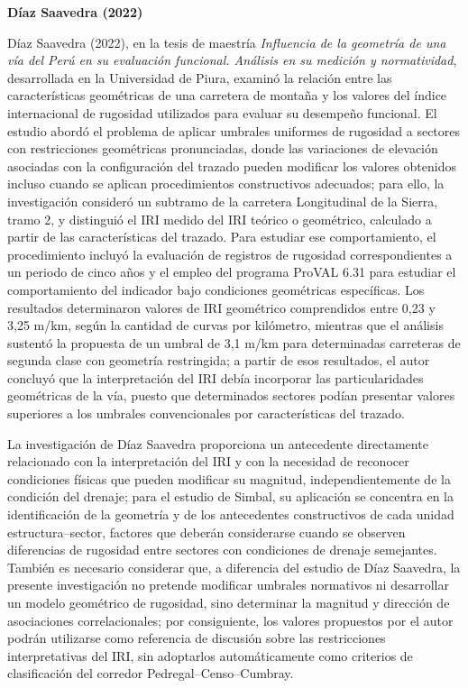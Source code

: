 \noindent\textbf{Díaz Saavedra (2022)}

Díaz Saavedra (2022), en la tesis de maestría \textit{Influencia de la geometría de una vía del Perú en su evaluación funcional. Análisis en su medición y normatividad}, desarrollada en la Universidad de Piura, examinó la relación entre las características geométricas de una carretera de montaña y los valores del índice internacional de rugosidad utilizados para evaluar su desempeño funcional. El estudio abordó el problema de aplicar umbrales uniformes de rugosidad a sectores con restricciones geométricas pronunciadas, donde las variaciones de elevación asociadas con la configuración del trazado pueden modificar los valores obtenidos incluso cuando se aplican procedimientos constructivos adecuados; para ello, la investigación consideró un subtramo de la carretera Longitudinal de la Sierra, tramo 2, y distinguió el IRI medido del IRI teórico o geométrico, calculado a partir de las características del trazado. Para estudiar ese comportamiento, el procedimiento incluyó la evaluación de registros de rugosidad correspondientes a un periodo de cinco años y el empleo del programa ProVAL 6.31 para estudiar el comportamiento del indicador bajo condiciones geométricas específicas. Los resultados determinaron valores de IRI geométrico comprendidos entre 0,23 y 3,25 m/km, según la cantidad de curvas por kilómetro, mientras que el análisis sustentó la propuesta de un umbral de 3,1 m/km para determinadas carreteras de segunda clase con geometría restringida; a partir de esos resultados, el autor concluyó que la interpretación del IRI debía incorporar las particularidades geométricas de la vía, puesto que determinados sectores podían presentar valores superiores a los umbrales convencionales por características del trazado.

La investigación de Díaz Saavedra proporciona un antecedente directamente relacionado con la interpretación del IRI y con la necesidad de reconocer condiciones físicas que pueden modificar su magnitud, independientemente de la condición del drenaje; para el estudio de Simbal, su aplicación se concentra en la identificación de la geometría y de los antecedentes constructivos de cada unidad estructura–sector, factores que deberán considerarse cuando se observen diferencias de rugosidad entre sectores con condiciones de drenaje semejantes. También es necesario considerar que, a diferencia del estudio de Díaz Saavedra, la presente investigación no pretende modificar umbrales normativos ni desarrollar un modelo geométrico de rugosidad, sino determinar la magnitud y dirección de asociaciones correlacionales; por consiguiente, los valores propuestos por el autor podrán utilizarse como referencia de discusión sobre las restricciones interpretativas del IRI, sin adoptarlos automáticamente como criterios de clasificación del corredor Pedregal–Censo–Cumbray.

